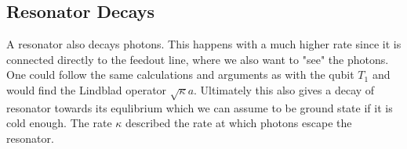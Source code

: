 


\subsection{Resonator Decays}
A resonator also decays photons. This happens with a much higher rate since it is connected directly to the feedout line, where we also want to "see" the photons. One could follow the same calculations and arguments as with the qubit $T_1$ and would find the Lindblad operator $\sqrt{\kappa}a$. Ultimately this also gives a decay of resonator towards its equlibrium which we can assume to be ground state if it is cold enough. The rate $\kappa$ described the rate at which photons escape the resonator.

